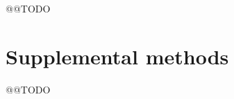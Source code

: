 \documentclass[a4paper,11pt,abstracton,hidelinks]{scrartcl}
\begin{document}
@@TODO


\begin{table}[h]
\centering
\begin{threeparttable}

\caption[Summary statistics for $H12$ selection signals at known insecticide-resistance genes]{
%
\textbf{Summary statistics for $H12$ selection signals at known insecticide-resistance genes.}
%
$H12_{peak}$ = maximum value of $H12$ found in proximity to gene.
%
$pos(H12_{peak})$ = position of $H12_{peak}$ value, relative to gene.
%
MAE = mean absolute error, i.e., mean distance from peak value to gene.
%
}

\label{fig:locus_stats_h12}




\end{threeparttable}
\end{table}

\clearpage


\section{Supplemental methods}

@@TODO


\printbibliography
\end{document}
